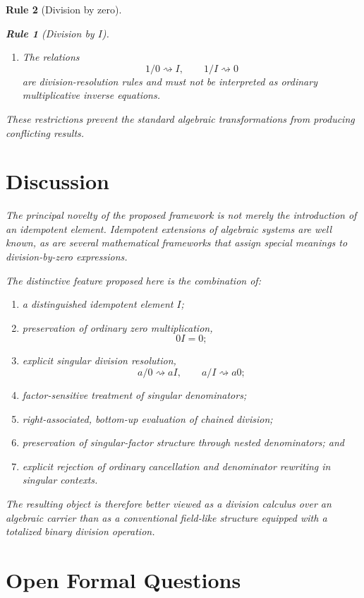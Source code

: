 \documentclass[11pt,a4paper]{article}
\newtheorem{rulethm}{Rule}[section]
\begin{document}
\begin{rulethm}[Division by zero]
\begin{rulethm}[Division by $I$]
\begin{enumerate}
    \item The relations
    \[
    1/0\rightsquigarrow I,
    \qquad
    1/I\rightsquigarrow0
    \]
    are division-resolution rules and must not be interpreted as ordinary
    multiplicative inverse equations.
\end{enumerate}

These restrictions prevent the standard algebraic transformations from
producing conflicting results.

\section{Discussion}

The principal novelty of the proposed framework is not merely the
introduction of an idempotent element. Idempotent extensions of algebraic
systems are well known, as are several mathematical frameworks that assign
special meanings to division-by-zero expressions.

The distinctive feature proposed here is the combination of:

\begin{enumerate}
    \item a distinguished idempotent element $I$;
    \item preservation of ordinary zero multiplication,
    \[
    0I=0;
    \]
    \item explicit singular division resolution,
    \[
    a/0\rightsquigarrow aI,
    \qquad
    a/I\rightsquigarrow a0;
    \]
    \item factor-sensitive treatment of singular denominators;
    \item right-associated, bottom-up evaluation of chained division;
    \item preservation of singular-factor structure through nested
    denominators; and
    \item explicit rejection of ordinary cancellation and denominator
    rewriting in singular contexts.
\end{enumerate}

The resulting object is therefore better viewed as a
\emph{division calculus over an algebraic carrier} than as a conventional
field-like structure equipped with a totalized binary division operation.

\section{Open Formal Questions}


\end{rulethm}
\end{rulethm}
\end{document}
